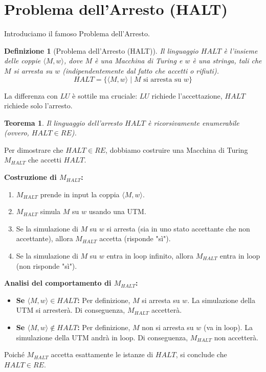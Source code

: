 \documentclass[a4paper]{article}
\makeatletter
\newtheorem{theorem}{Teorema}[section] %
\newtheorem{definition}{Definizione}[section] %
\renewenvironment{proof}[1][\proofname]{\par
  \pushQED{\qed}%
  \normalfont \topsep6\p@\@plus6\p@\relax
  \trivlist
  \item[\hskip\labelsep
        \bfseries
    #1\@addpunct{.}]\ignorespaces
}{%
  \popQED\endtrivlist\@endpefalse
}
\makeatother
\begin{document}
\section{Problema dell'Arresto (HALT)}
Introduciamo il famoso Problema dell'Arresto.
\begin{definition}[Problema dell'Arresto (HALT)]
Il linguaggio $HALT$ è l'insieme delle coppie $\langle M, w \rangle$, dove $M$ è una Macchina di Turing e $w$ è una stringa, tali che $M$ si arresta su $w$ (indipendentemente dal fatto che accetti o rifiuti).
\[ HALT = \{ \langle M, w \rangle \mid M \text{ si arresta su } w \} \]
\end{definition}
La differenza con $LU$ è sottile ma cruciale: $LU$ richiede l'accettazione, $HALT$ richiede solo l'arresto.

\begin{theorem}
Il linguaggio dell'arresto $HALT$ è ricorsivamente enumerabile (ovvero, $HALT \in RE$).
\end{theorem}
\begin{proof}
Per dimostrare che $HALT \in RE$, dobbiamo costruire una Macchina di Turing $M_{HALT}$ che accetti $HALT$.

\textbf{Costruzione di $M_{HALT}$:}
\begin{enumerate}
    \item $M_{HALT}$ prende in input la coppia $\langle M, w \rangle$.
    \item $M_{HALT}$ simula $M$ su $w$ usando una UTM.
    \item Se la simulazione di $M$ su $w$ si arresta (sia in uno stato accettante che non accettante), allora $M_{HALT}$ accetta (risponde "sì").
    \item Se la simulazione di $M$ su $w$ entra in loop infinito, allora $M_{HALT}$ entra in loop (non risponde "sì").
\end{enumerate}
\textbf{Analisi del comportamento di $M_{HALT}$:}
\begin{itemize}
    \item \textbf{Se $\langle M, w \rangle \in HALT$:}
    Per definizione, $M$ si arresta su $w$. La simulazione della UTM si arresterà. Di conseguenza, $M_{HALT}$ accetterà.
    \item \textbf{Se $\langle M, w \rangle \notin HALT$:}
    Per definizione, $M$ non si arresta su $w$ (va in loop). La simulazione della UTM andrà in loop. Di conseguenza, $M_{HALT}$ non accetterà.
\end{itemize}
Poiché $M_{HALT}$ accetta esattamente le istanze di $HALT$, si conclude che $HALT \in RE$.
\end{proof}
\end{document}
